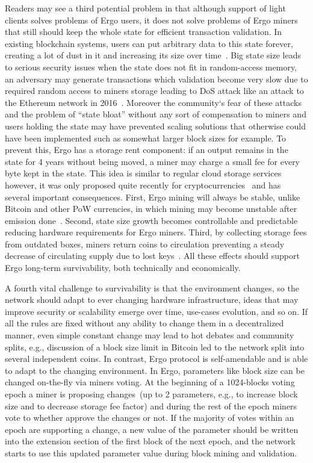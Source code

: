 Readers may see a third potential problem in that although support of light clients
solves problems of Ergo users, it does not solve problems
of Ergo miners that still should keep the whole state for efficient
transaction validation.
In existing blockchain systems, users can put arbitrary data to this state forever,
creating a lot of dust in it and increasing its size over time~\cite{perez2019another}.
Big state size leads to serious security issues when the state does not fit in random-access memory,
an adversary may generate transactions which validation become very slow due to required random
access to miners storage
leading to DoS attack like an attack to the Ethereum network in 2016~\cite{??}.
Moreover the community`s fear of these attacks and the problem of ``state bloat'' without any sort of
compensation to miners and users holding the state may have prevented scaling solutions that otherwise
could have been implemented such as somewhat larger block sizes for example.
To prevent this, Ergo has a storage rent component: if an
output remains in the state for 4 years without being moved, a miner may charge a small fee for every
byte kept in the state.
This idea is similar to regular cloud storage services however, it was only proposed quite recently for
cryptocurrencies~\cite{chepurnoy2017space} and has several important consequences.
First, Ergo mining will always be stable, unlike Bitcoin and other PoW currencies,
in which mining may become unstable after emission done~\cite{carlsten2016instability}.
Second, state size growth becomes controllable and predictable reducing hardware requirements for Ergo miners.
Third, by collecting storage fees from outdated boxes, miners return coins to circulation preventing a steady decrease
of circulating supply due to lost keys~\cite{wsj2018}.
All these effects should support Ergo long-term survivability, both technically and economically.

A fourth vital challenge to survivability is that the environment changes, so the network should
adapt to ever changing hardware infrastructure, ideas that may improve security or
scalability emerge over time, use-cases evolution, and so on.
If all the rules are fixed without any ability to change them in a decentralized manner, even
simple constant change may lead to hot debates and community splits, e.g., discussion of a block
size limit in Bitcoin led to the network split into several independent coins.
In contrast, Ergo protocol is self-amendable and is able to adapt to the changing environment.
In Ergo, parameters like block size can be changed on-the-fly via miners voting.
At the beginning of a 1024-blocks voting epoch a miner is proposing changes~(up to 2 parameters,
e.g., to increase block size and to decrease storage fee factor) and during the rest of the epoch miners
vote to whether approve the changes or not.
If the majority of votes within an epoch are supporting a change, a new value of
the parameter should be written into the extension section of the first block of the next epoch, and
the network starts to use this updated parameter value during block mining and validation.

